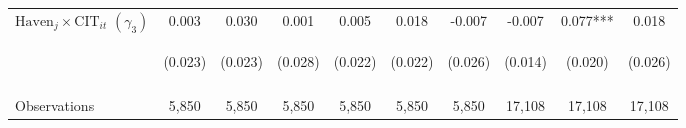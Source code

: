 \begin{center}
\begin{tabular}{lccccccccc}
$\text{Haven}_j\times\text{CIT}_{it}$ $ (\gamma_3)$ & 0.003 & 0.030 & 0.001 & 0.005 & 0.018 & -0.007 & -0.007 & 0.077*** & 0.018 \\
 & \begin{footnotesize}(0.023)\end{footnotesize} & \begin{footnotesize}(0.023)\end{footnotesize} & \begin{footnotesize}(0.028)\end{footnotesize} & \begin{footnotesize}(0.022)\end{footnotesize} & \begin{footnotesize}(0.022)\end{footnotesize} & \begin{footnotesize}(0.026)\end{footnotesize} & \begin{footnotesize}(0.014)\end{footnotesize} & \begin{footnotesize}(0.020)\end{footnotesize} & \begin{footnotesize}(0.026)\end{footnotesize} \\
\vspace{4pt} & \begin{footnotesize}\end{footnotesize} & \begin{footnotesize}\end{footnotesize} & \begin{footnotesize}\end{footnotesize} & \begin{footnotesize}\end{footnotesize} & \begin{footnotesize}\end{footnotesize} & \begin{footnotesize}\end{footnotesize} & \begin{footnotesize}\end{footnotesize} & \begin{footnotesize}\end{footnotesize} & \begin{footnotesize}\end{footnotesize} \\
Observations & 5,850 & 5,850 & 5,850 & 5,850 & 5,850 & 5,850 & 17,108 & 17,108 & 17,108 \\

\end{tabular}
\end{center}

